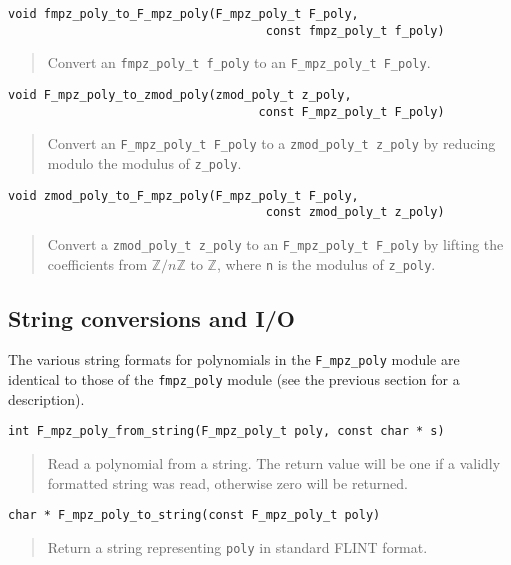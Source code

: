 \documentclass[a4paper,10pt]{article}
\newcommand{\Z}{\mathbb{Z}}
\newcommand{\code}{\lstinline}
\begin{document}
\begin{lstlisting}
void fmpz_poly_to_F_mpz_poly(F_mpz_poly_t F_poly, 
                                    const fmpz_poly_t f_poly)
\end{lstlisting}
\begin{quote}
Convert an \code{fmpz_poly_t f_poly} to an \code{F_mpz_poly_t F_poly}.
\end{quote}

\begin{lstlisting}
void F_mpz_poly_to_zmod_poly(zmod_poly_t z_poly, 
                                   const F_mpz_poly_t F_poly)
\end{lstlisting}
\begin{quote}
Convert an \code{F_mpz_poly_t F_poly} to a \code{zmod_poly_t z_poly} by reducing modulo the modulus 
of \code{z_poly}.
\end{quote}

\begin{lstlisting}
void zmod_poly_to_F_mpz_poly(F_mpz_poly_t F_poly, 
                                    const zmod_poly_t z_poly)
\end{lstlisting}
\begin{quote}
Convert a \code{zmod_poly_t z_poly} to an \code{F_mpz_poly_t F_poly} by lifting the coefficients 
from $\Z/n\Z$ to $\Z$, where \code{n} is the modulus of \code{z_poly}.
\end{quote}

\subsection{String conversions and I/O}

The various string formats for polynomials in the \code{F_mpz_poly} module are identical to those
of the \code{fmpz_poly} module (see the previous section for a description).

\begin{lstlisting}
int F_mpz_poly_from_string(F_mpz_poly_t poly, const char * s)
\end{lstlisting}
\begin{quote}
Read a polynomial from a string. The return value will be one if a validly formatted string was
read, otherwise zero will be returned.
\end{quote}

\begin{lstlisting}
char * F_mpz_poly_to_string(const F_mpz_poly_t poly)
\end{lstlisting}
\begin{quote}
Return a string representing \code{poly} in standard FLINT format.
\end{quote}
\end{document}
